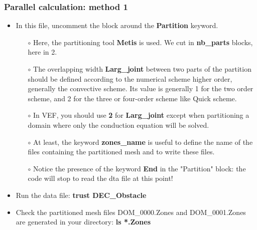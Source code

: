 \documentclass[10pt]{beamer}
\begin{document}
\begin{frame}
\frametitle{Parallel calculation: method 1}
\begin{block}{}

\begin{itemize}
\item In this file, uncomment the block around the \textbf{Partition} keyword.
    \begin{itemize}
    \item [$\circ$] Here, the partitioning tool \textbf{Metis} is used. We cut in \textbf{nb\_parts} blocks, here in 2.
    \item [$\circ$] The overlapping width \textbf{Larg\_joint} between two parts of the partition should be defined according to the numerical scheme higher order, generally the convective scheme. Its value is generally 1 for the two order scheme, and 2 for the three or four-order scheme like Quick scheme.
    \item [$\circ$] In VEF, you should use \textbf{2} for \textbf{Larg\_joint} except when partitioning a domain where only the conduction equation will be solved.
    \item [$\circ$] At least, the keyword \textbf{zones\_name} is useful to define the name of the files containing the partitioned mesh and to write these files.
    \item [$\circ$] Notice the presence of the keyword \textbf{End} in the "Partition" block: the code will stop to read the dta file at this point!
    \end{itemize}

\item Run the data file: \textbf{trust DEC\_Obstacle}

\item Check the partitioned mesh files DOM\_0000.Zones and DOM\_0001.Zones are generated in your directory: \textbf{ls *.Zones}
\end{itemize}

\end{block}
\end{frame}
\end{document}
